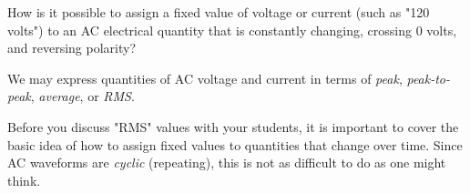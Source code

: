 

How is it possible to assign a fixed value of voltage or current (such as "120 volts") to an AC electrical quantity that is constantly changing, crossing 0 volts, and reversing polarity?







We may express quantities of AC voltage and current in terms of {\it peak}, {\it peak-to-peak}, {\it average}, or {\it RMS}.







Before you discuss "RMS" values with your students, it is important to cover the basic idea of how to assign fixed values to quantities that change over time.  Since AC waveforms are {\it cyclic} (repeating), this is not as difficult to do as one might think.




